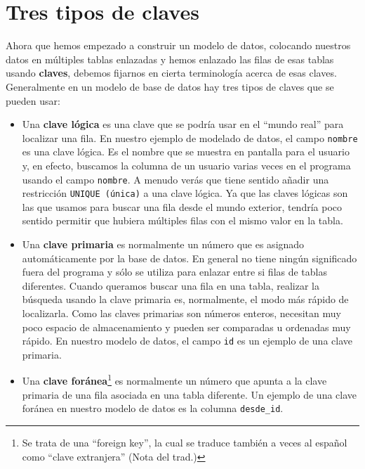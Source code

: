 \section{Tres tipos de claves}

Ahora que hemos empezado a construir un modelo de datos, colocando
nuestros datos en múltiples tablas enlazadas y hemos enlazado las filas de esas
tablas usando {\bf claves}, debemos fijarnos en cierta terminología
acerca de esas claves. Generalmente en un modelo de base de datos hay
tres tipos de claves que se pueden usar:

\begin{itemize}

\item Una {\bf clave lógica} es una clave que se podría usar en el ``mundo real''
para localizar una fila. En nuestro ejemplo de modelado de datos, el campo
{\tt nombre} es una clave lógica. Es el nombre que se muestra en pantalla para el usuario
y, en efecto, buscamos la columna de un usuario varias veces en el programa
usando el campo {\tt nombre}. A menudo verás que tiene sentido
añadir una restricción {\tt UNIQUE (única)} a una clave lógica. Ya que las
claves lógicas son las que usamos para buscar una fila desde el mundo exterior, tendría
poco sentido permitir que hubiera múltiples filas con el mismo valor en la tabla.

\item Una {\bf clave primaria} es normalmente un número que es asignado
automáticamente por la base de datos. En general no tiene ningún significado fuera
del programa y sólo se utiliza para enlazar entre si filas de tablas diferentes.
Cuando queramos buscar una fila en una tabla, realizar
la búsqueda usando la clave primaria es, normalmente, el modo
más rápido de localizarla. Como las claves primarias son números enteros,
necesitan muy poco espacio de almacenamiento y pueden ser comparadas u ordenadas muy rápido.
En nuestro modelo de datos, el campo {\tt id} es un ejemplo de una clave primaria.

\item Una {\bf clave foránea}\footnote{Se trata de una ``foreign key'', la cual se traduce
también a veces al español como ``clave extranjera'' (Nota del trad.)}
 es normalmente un número que apunta a la clave primaria
de una fila asociada en una tabla diferente. Un ejemplo de una clave foránea
en nuestro modelo de datos es la columna \verb"desde_id".

\end{itemize}


